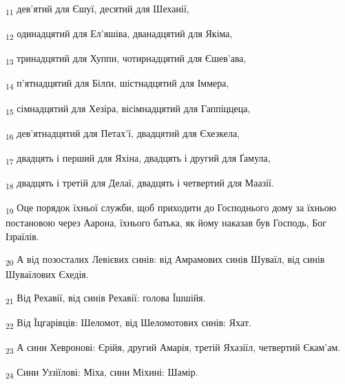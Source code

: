 \begin{tcolorbox}
\textsubscript{11} дев'ятий для Єшуї, десятий для Шеханії,
\end{tcolorbox}
\begin{tcolorbox}
\textsubscript{12} одинадцятий для Ел'яшіва, дванадцятий для Якіма,
\end{tcolorbox}
\begin{tcolorbox}
\textsubscript{13} тринадцятий для Хуппи, чотирнадцятий для Єшев'ава,
\end{tcolorbox}
\begin{tcolorbox}
\textsubscript{14} п'ятнадцятий для Білґи, шістнадцятий для Іммера,
\end{tcolorbox}
\begin{tcolorbox}
\textsubscript{15} сімнадцятий для Хезіра, вісімнадцятий для Гаппіццеца,
\end{tcolorbox}
\begin{tcolorbox}
\textsubscript{16} дев'ятнадцятий для Петах'ї, двадцятий для Єхезкела,
\end{tcolorbox}
\begin{tcolorbox}
\textsubscript{17} двадцять і перший для Яхіна, двадцять і другий для Ґамула,
\end{tcolorbox}
\begin{tcolorbox}
\textsubscript{18} двадцять і третій для Делаї, двадцять і четвертий для Маазії.
\end{tcolorbox}
\begin{tcolorbox}
\textsubscript{19} Оце порядок їхньої служби, щоб приходити до Господнього дому за їхньою постановою через Аарона, їхнього батька, як йому наказав був Господь, Бог Ізраїлів.
\end{tcolorbox}
\begin{tcolorbox}
\textsubscript{20} А від позосталих Левієвих синів: від Амрамових синів Шуваїл, від синів Шуваїлових Єхедія.
\end{tcolorbox}
\begin{tcolorbox}
\textsubscript{21} Від Рехавії, від синів Рехавії: голова Їшшійя.
\end{tcolorbox}
\begin{tcolorbox}
\textsubscript{22} Від Їцгарівців: Шеломот, від Шеломотових синів: Яхат.
\end{tcolorbox}
\begin{tcolorbox}
\textsubscript{23} А сини Хевронові: Єрійя, другий Амарія, третій Яхазіїл, четвертий Єкам'ам.
\end{tcolorbox}
\begin{tcolorbox}
\textsubscript{24} Сини Уззіїлові: Міха, сини Міхині: Шамір.
\end{tcolorbox}
